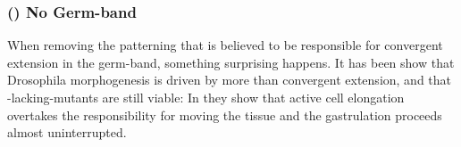 






\subsubsection{() No Germ-band }
\label{sec:mutantNoGB}
When removing the patterning that is believed to be responsible for convergent extension in the germ-band, something surprising happens. It has been show that Drosophila morphogenesis is driven by more than convergent extension, and that -lacking-mutants are still viable: In  they show that active cell elongation overtakes the responsibility for moving the tissue and the gastrulation proceeds almost uninterrupted.\\

